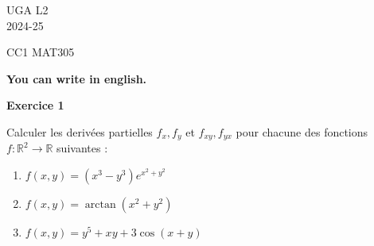 \documentclass[a4paper,12pt]{article}
\begin{document}
	\noindent UGA \hfill L2\\
	\hfill 2024-25 \\
	\bigskip

	\begin{center}
		\textsc{CC1 MAT305}


{\bf You can write in english.}
		

	\end{center}
	\bigskip
	
\hrulefill
	
\vspace{1cm}

 

\begin{center}
{\large{\bf Exercice 1}}
\end{center}


Calculer les derivées partielles $f_x,f_y$ et $f_{xy}, f_{yx}$ pour
chacune des fonctions\\ 
$f:\mathbb{R}^2 \rightarrow \mathbb{R}$  suivantes :

 
 \begin{enumerate}
 
	\item  $f(x,y) = (x^3 - y^3)e^{x^2 + y^2}$

	\item $f(x,y) = \arctan(x^2 + y^2)$


	\item $f(x,y) = y^5 + xy + 3\cos(x+y)$

 \end{enumerate}


\end{document}
